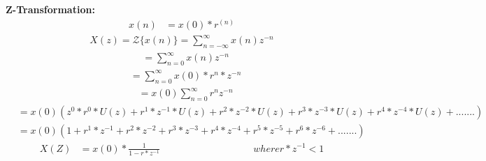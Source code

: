 \documentclass[a4,12pt,onecolumn]{IEEEtran}
\begin{document}
\textbf{\large{Z-Transformation:}}
 \begin{align}
  x(n) &= x(0)*r^{(n)} \end{align} 
\begin{align} X(z) = \mathcal{Z}\{x(n)\} = \sum_{n=-\infty}^{\infty} x(n)z^{-n}\end{align} 
 \begin{align}&=\sum_{n=0}^{\infty} x(n)z^{-n} \end{align} 
\begin{align}&=\sum_{n=0}^{\infty} x(0)*r^n*z^{-n} \end{align} 
\begin{align}&=x(0)\sum_{n=0}^{\infty} r^nz^{-n} \end{align} 
\begin{align}&=x(0)(z^0*r^0*U(z)+ r^1*z^{-1}*U(z)+r^2*z^{-2}*U(z)+r^3*z^{-3}*U(z)+r^4*z^{-4}*U(z)+.......)\end{align} 
\begin{align}&= x(0)(1+r^1*z^{-1}+r^2*z^{-2}+r^3*z^{-3}+r^4*z^{-4}+r^5*z^{-5}+r^6*z^{-6}+.......)\end{align} 
\begin{align}X(Z)&=x(0)*\frac{1}{1-r*z^{-1}}\hspace{4cm}where r*z^{-1}<1\end{align} 
\end{document}
